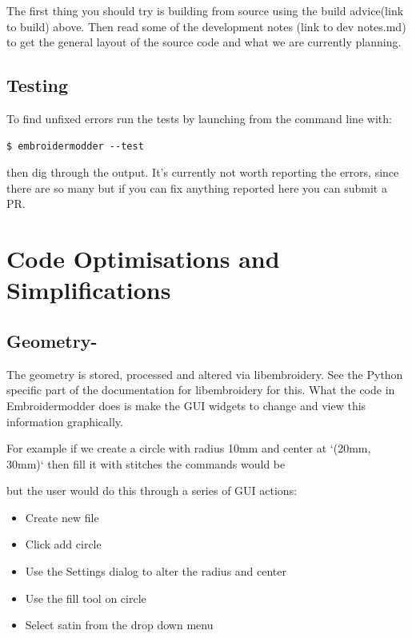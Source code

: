 \documentclass[a4paper]{report}
\begin{document}
The first thing you should try is building from source using the build advice(link to build)
above. Then read some of the development notes (link to dev notes.md) to get the general
layout of the source code and what we are currently planning.

\subsection{Testing}

To find unfixed errors run the tests by launching from the command line with:

\begin{lstlisting}
$ embroidermodder --test
\end{lstlisting}

then dig through the output. It's currently not worth reporting the errors, since
there are so many but if you can fix anything reported here you can submit a PR.

\section{Code Optimisations and Simplifications}

\subsection{Geometry-}

The geometry is stored, processed and altered via libembroidery. See the Python specific part
of the documentation for libembroidery for this. What the code in Embroidermodder does is make
the GUI widgets to change and view this information graphically.

For example if we create a circle with radius 10mm and center at `(20mm, 30mm)` then fill it
with stitches the commands would be



but the user would do this through a series of GUI actions:

\begin{itemize}
\item Create new file
\item Click add circle
\item Use the Settings dialog to alter the radius and center
\item Use the fill tool on circle
\item Select satin from the drop down menu
\end{itemize}
\end{document}
